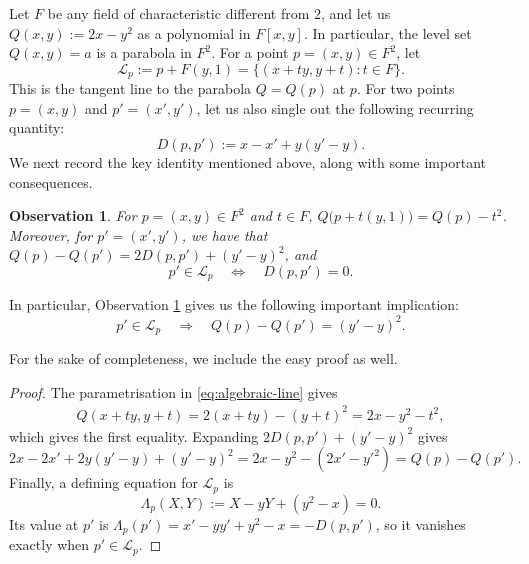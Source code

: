 \documentclass[11pt,reqno]{amsart}
\newtheorem{observation}[observation]{Observation}
\theoremstyle{definition}
\theoremstyle{remark}
\begin{document}
Let $F$ be any field of characteristic different from $2$, and let us $Q(x,y):=2x-y^2$ as a polynomial in $F[x,y]$. In particular, the level set $Q(x,y)=a$ is a parabola in $F^2$.  For a point $p=(x,y)\in F^2$,
let
\begin{equation}
\label{eq:algebraic-line}
        \mathcal L_p
        :=p+F(y,1)
        =\{(x+ty,y+t):t\in F\}.
\end{equation}
This is the tangent line to the parabola $Q=Q(p)$ at $p$. For two points $p=(x,y)$ and $p'=(x',y')$, let us also single out the following recurring quantity:
\begin{equation}
\label{eq:D-definition}
        D(p,p'):=x-x'+y(y'-y).
\end{equation}
We next record the key identity mentioned above, along with some important consequences.

\begin{observation}
\label{lem:parabola-identity}
For $p=(x,y)\in F^2$ and $t\in F$, $Q\bigl(p+t(y,1)\bigr)=Q(p)-t^2$. Moreover, for $p'=(x',y')$, we have that $Q(p)-Q(p')=2D(p,p')+(y'-y)^2$,
and
\begin{equation}
\label{eq:line-incidence-D}
        p'\in\mathcal L_p
        \quad\Longleftrightarrow\quad
        D(p,p')=0.
\end{equation}
\end{observation}

In particular, Observation \ref{lem:parabola-identity} gives us the following important implication:
\begin{equation}
\label{eq:parabola-incidence}
        p'\in\mathcal L_p
        \quad\Longrightarrow\quad
        Q(p)-Q(p')=(y'-y)^2.
\end{equation}

For the sake of completeness, we include the easy proof as well.

\begin{proof}
The parametrisation in \eqref{eq:algebraic-line} gives
\[
\begin{aligned}
        Q(x+ty,y+t)=2(x+ty)-(y+t)^2=2x-y^2-t^2,
\end{aligned}
\]
which gives the first equality. Expanding $2D(p,p')+(y'-y)^2$ gives
\[
        2x-2x'+2y(y'-y)+(y'-y)^2
        =2x-y^2-(2x'-y'^2)=Q(p)-Q(p').
\]
Finally, a defining equation for $\mathcal L_p$ is
\begin{equation}
\label{eq:unscaled-line-equation}
        \Lambda_p(X,Y):=X-yY+(y^2-x)=0.
\end{equation}
Its value at $p'$ is $\Lambda_p(p')=x'-yy'+y^2-x=-D(p,p')$, so it vanishes exactly when $p'\in\mathcal L_p$.
\end{proof}
\end{document}
